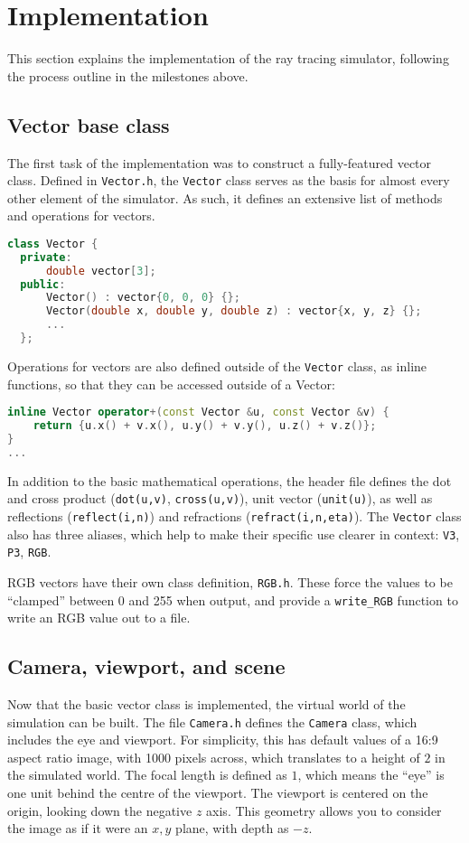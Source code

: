 \documentclass[a4paper]{article}
\begin{document}
\section{Implementation}
This section explains the implementation of the ray tracing simulator, following the process outline in the milestones above.

\subsection{Vector base class}
The first task of the implementation was to construct a fully-featured vector class. Defined in \verb|Vector.h|, the \verb|Vector| class serves as the basis for almost every other element of the simulator. As such, it defines an extensive list of methods and operations for vectors.

\begin{lstlisting}[language=C++, belowskip=-0.8 \baselineskip]
class Vector {
  private:
      double vector[3];
  public:
      Vector() : vector{0, 0, 0} {};
      Vector(double x, double y, double z) : vector{x, y, z} {};
      ...
  };
\end{lstlisting}Operations for vectors are also defined outside of the \verb|Vector| class, as inline functions, so that they can be accessed outside of a Vector:
\begin{lstlisting}[language=C++, belowskip=-0.8 \baselineskip]
inline Vector operator+(const Vector &u, const Vector &v) {
    return {u.x() + v.x(), u.y() + v.y(), u.z() + v.z()};
}
...
\end{lstlisting}In addition to the basic mathematical operations, the header file defines the dot and cross product (\verb|dot(u,v)|, \verb|cross(u,v)|), unit vector (\verb|unit(u)|), as well as reflections (\verb|reflect(i,n)|) and refractions (\verb|refract(i,n,eta)|). The \verb|Vector| class also has three aliases, which help to make their specific use clearer in context: \verb|V3|, \verb|P3|, \verb|RGB|.

RGB vectors have their own class definition, \verb|RGB.h|. These force the values to be ``clamped'' between 0 and 255 when output, and provide a \verb|write_RGB| function to write an RGB value out to a file.

\subsection{Camera, viewport, and scene}
Now that the basic vector class is implemented, the virtual world of the simulation can be built. The file \verb|Camera.h| defines the \verb|Camera| class, which includes the eye and viewport. For simplicity, this has default values of a 16:9 aspect ratio image, with 1000 pixels across, which translates to a height of $2$ in the simulated world. The focal length is defined as $1$, which means the ``eye'' is one unit behind the centre of the viewport. The viewport is centered on the origin, looking down the negative $z$ axis. This geometry allows you to consider the image as if it were an $x,y$ plane, with depth as $-z$. 
\end{document}
